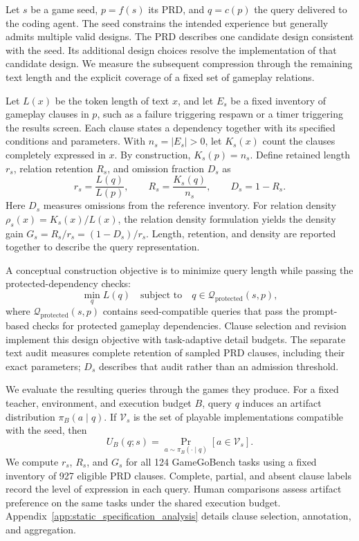 \documentclass{article}
\begin{document}
Let $s$ be a game seed, $p=f(s)$ its PRD, and $q=c(p)$ the query delivered to the coding agent. The seed constrains the intended experience but generally admits multiple valid designs. The PRD describes one candidate design consistent with the seed. Its additional design choices resolve the implementation of that candidate design. We measure the subsequent compression through the remaining text length and the explicit coverage of a fixed set of gameplay relations.

Let $L(x)$ be the token length of text $x$, and let $E_s$ be a fixed inventory of gameplay clauses in $p$, such as a failure triggering respawn or a timer triggering the results screen. Each clause states a dependency together with its specified conditions and parameters. With $n_s=|E_s|>0$, let $K_s(x)$ count the clauses completely expressed in $x$. By construction, $K_s(p)=n_s$. Define retained length $r_s$, relation retention $R_s$, and omission fraction $D_s$ as
\begin{equation}
    r_s=\frac{L(q)}{L(p)},\qquad
    R_s=\frac{K_s(q)}{n_s},\qquad
    D_s=1-R_s.
    \label{eq:retention_and_omission}
\end{equation}
Here \(D_s\) measures omissions from the reference inventory. For relation density \(\rho_s(x)=K_s(x)/L(x)\), the relation density formulation yields the density gain \(G_s=R_s/r_s=(1-D_s)/r_s\). Length, retention, and density are reported together to describe the query representation.

A conceptual construction objective is to minimize query length while passing the protected-dependency checks:
\begin{equation}
    \min_q L(q)
    \quad\text{subject to}\quad
    q\in\mathcal{Q}_{\mathrm{protected}}(s,p),
    \label{eq:specification_objective}
\end{equation}
where $\mathcal{Q}_{\mathrm{protected}}(s,p)$ contains seed-compatible queries that pass the prompt-based checks for protected gameplay dependencies. Clause selection and revision implement this design objective with task-adaptive detail budgets. The separate text audit measures complete retention of sampled PRD clauses, including their exact parameters; $D_s$ describes that audit rather than an admission threshold.

We evaluate the resulting queries through the games they produce. For a fixed teacher, environment, and execution budget $B$, query $q$ induces an artifact distribution $\pi_B(a\mid q)$. If $\mathcal{V}_s$ is the set of playable implementations compatible with the seed, then
\begin{equation}
    U_B(q;s)=\Pr_{a\sim\pi_B(\cdot\mid q)}[a\in\mathcal{V}_s].
    \label{eq:valid_artifact_probability}
\end{equation}
We compute $r_s$, $R_s$, and $G_s$ for all 124 GameGoBench tasks using a fixed inventory of 927 eligible PRD clauses. Complete, partial, and absent clause labels record the level of expression in each query. Human comparisons assess artifact preference on the same tasks under the shared execution budget. Appendix~\ref{app:static_specification_analysis} details clause selection, annotation, and aggregation.
\end{document}
